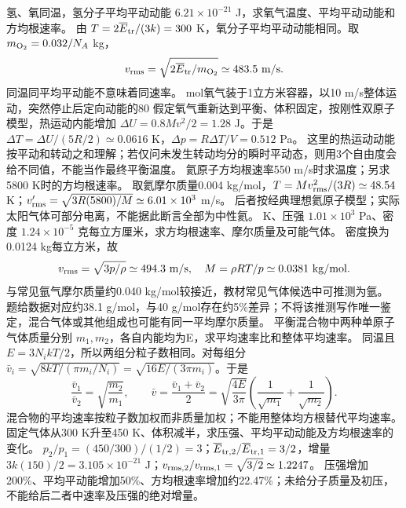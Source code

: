 \problemtext 氢、氧同温，氢分子平均平动动能 $6.21\times10^{-21}$ J，求氧气温度、平均平动动能和方均根速率。
\workings 由 $T=2\overline E_{\rm tr}/(3k)=300$ K，氧分子平均平动动能相同。取 $m_{\rm O_2}=0.032/N_A$ kg，
\[
v_{\rm rms}=\sqrt{2\overline E_{\rm tr}/m_{\rm O_2}}\simeq483.5\ \mathrm{m/s}.
\]
\crosscheck 同温同平均平动能不意味着同速率。
 mol氧气装于1立方米容器，以10 m/s整体运动，突然停止后定向动能的80%
\workings 假定氧气重新达到平衡、体积固定，按刚性双原子模型，热运动内能增加 $\Delta U=0.8Mv^2/2=1.28$ J。于是 $\Delta T=\Delta U/(5R/2)\simeq0.0616$ K，$\Delta p=R\Delta T/V=0.512$ Pa。
\crosscheck 这里的热运动动能按平动和转动之和理解；若仅问未发生转动均分的瞬时平动态，则用3个自由度会给不同值，不能当作最终平衡温度。
\problemtext 氦原子方均根速率550 m/s时求温度；另求5800 K时的方均根速率。
\workings 取氦摩尔质量0.004 kg/mol，$T=Mv_{\rm rms}^2/(3R)\simeq48.54$ K；$v_{\rm rms}'=\sqrt{3R(5800)/M}\simeq6.01\times10^3$ m/s。
\crosscheck 后者按经典理想氦原子模型；实际太阳气体可部分电离，不能据此断言全部为中性氦。
 K、压强 $1.01\times10^3$ Pa、密度 $1.24\times10^{-5}$ 克每立方厘米，求方均根速率、摩尔质量及可能气体。
\workings 密度换为0.0124 kg每立方米，故
\[
v_{\rm rms}=\sqrt{3p/\rho}\simeq494.3\ \mathrm{m/s},\quad
M=\rho RT/p\simeq0.0381\ \mathrm{kg/mol}.
\]
与常见氩气摩尔质量约0.040 kg/mol较接近，教材常见气体候选中可推测为氩。
\crosscheck 题给数据对应约38.1 g/mol，与40 g/mol存在约5\%差异；不将该推测写作唯一鉴定，混合气体或其他组成也可能有同一平均摩尔质量。
\problemtext 平衡混合物中两种单原子气体质量分别 $m_1,m_2$，各自内能均为E，求平均速率比和整体平均速率。
\workings 同温且 $E=3N_i kT/2$，所以两组分粒子数相同。对每组分 $\bar v_i=\sqrt{8kT/(\pi m_i/N_i)}=\sqrt{16E/(3\pi m_i)}$。于是
\[
\frac{\bar v_1}{\bar v_2}=\sqrt{\frac{m_2}{m_1}},\qquad
\bar v=\frac{\bar v_1+\bar v_2}{2}
=\sqrt{\frac{4E}{3\pi}}\left(\frac1{\sqrt{m_1}}+\frac1{\sqrt{m_2}}\right).
\]
\crosscheck 混合物的平均速率按粒子数加权而非质量加权；不能用整体均方根替代平均速率。
\problemtext 固定气体从300 K升至450 K、体积减半，求压强、平均平动动能及方均根速率的变化。
\workings $p_2/p_1=(450/300)/(1/2)=3$；$\overline E_{{\rm tr},2}/\overline E_{{\rm tr},1}=3/2$，增量 $3k(150)/2=3.105\times10^{-21}$ J；$v_{{\rm rms},2}/v_{{\rm rms},1}=\sqrt{3/2}\simeq1.2247$。
\crosscheck 压强增加200\%、平均平动能增加50\%、方均根速率增加约22.47\%；未给分子质量及初压，不能给后二者中速率及压强的绝对增量。

